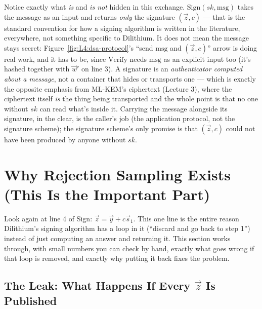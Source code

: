 Notice exactly what \emph{is} and \emph{is not} hidden in this exchange. $\mathrm{Sign}(sk,\text{msg})$ takes the message as an input and returns \emph{only} the signature $(\vec z, c)$ --- that is the standard convention for how a signing algorithm is written in the literature, everywhere, not something specific to Dilithium. It does not mean the message stays secret: Figure~\ref{fig:L4:dsa-protocol}'s ``send $\text{msg}$ and $(\vec z,c)$'' arrow is doing real work, and it has to be, since $\mathrm{Verify}$ needs $\text{msg}$ as an explicit input too (it's hashed together with $\vec w'$ on line 3). A signature is an \emph{authenticator computed about a message}, not a container that hides or transports one --- which is exactly the opposite emphasis from ML-KEM's ciphertext (Lecture 3), where the ciphertext itself \emph{is} the thing being transported and the whole point is that no one without $sk$ can read what's inside it. Carrying the message alongside its signature, in the clear, is the caller's job (the application protocol, not the signature scheme); the signature scheme's only promise is that $(\vec z,c)$ could not have been produced by anyone without $sk$.

\section{Why Rejection Sampling Exists (This Is the Important Part)}
\label{sec:L4:why-rejection-sampling-exists-this-is-th}

Look again at line 4 of Sign: $\vec z = \vec y + c\vec s_1$. This one line is the entire reason Dilithium's signing algorithm has a loop in it (``discard and go back to step 1'') instead of just computing an answer and returning it. This section works through, with small numbers you can check by hand, exactly what goes wrong if that loop is removed, and exactly why putting it back fixes the problem.

\subsection{The Leak: What Happens If Every $\vec z$ Is Published}
\label{sec:L4:the-leak-what-happens-if-every-z-is-publ}


